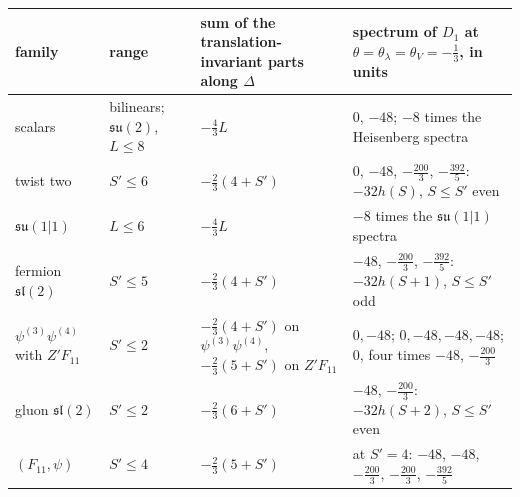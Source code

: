 \begin{tabular}{l|l|l|l}
family & range & sum of the translation-invariant parts along $\Delta$ & spectrum of $D_1$ at $\theta=\theta_\lambda=\theta_V=-\tfrac13$, in units\\
\hline
scalars & bilinears; $\mathfrak{su}(2)$, $L\le8$ & $-\tfrac43L$ & $0$, $-48$; $-8$ times the Heisenberg spectra\\
twist two & $S'\le6$ & $-\tfrac23(4+S')$ & $0$, $-48$, $-\tfrac{200}3$, $-\tfrac{392}5$: $-32h(S)$, $S\le S'$ even\\
$\mathfrak{su}(1|1)$ & $L\le6$ & $-\tfrac43L$ & $-8$ times the $\mathfrak{su}(1|1)$ spectra\\
fermion $\mathfrak{sl}(2)$ & $S'\le5$ & $-\tfrac23(4+S')$ & $-48$, $-\tfrac{200}3$, $-\tfrac{392}5$: $-32h(S+1)$, $S\le S'$ odd\\
$\psi^{(3)}\psi^{(4)}$ with $Z'F_{11}$ & $S'\le2$ & $-\tfrac23(4+S')$ on $\psi^{(3)}\psi^{(4)}$, $-\tfrac23(5+S')$ on $Z'F_{11}$ & $0,-48$; $0,-48,-48,-48$; $0$, four times $-48$, $-\tfrac{200}3$\\
gluon $\mathfrak{sl}(2)$ & $S'\le2$ & $-\tfrac23(6+S')$ & $-48$, $-\tfrac{200}3$: $-32h(S+2)$, $S\le S'$ even\\
$(F_{11},\psi)$ & $S'\le4$ & $-\tfrac23(5+S')$ & at $S'=4$: $-48$, $-48$, $-\tfrac{200}3$, $-\tfrac{200}3$, $-\tfrac{392}5$\\
\end{tabular}

